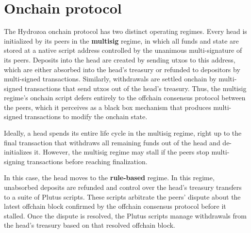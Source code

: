 \documentclass[../hydrozoa.tex]{subfiles}
\begin{document}
\chapter{Onchain protocol}%
\label{h:onchain-protocol}

The Hydrozoa onchain protocol has two distinct operating regimes.
Every head is initialized by its peers in the \textbf{multisig} regime, in which all funds and state are stored at a native script address controlled by the unanimous multi-signature of its peers.
Deposits into the head are created by sending utxos to this address, which are either absorbed into the head's treasury or refunded to depositors by multi-signed transactions.
Similarly, withdrawals are settled onchain by multi-signed transactions that send utxos out of the head's treasury.
Thus, the multisig regime's onchain script defers entirely to the offchain consensus protocol between the peers, which it perceives as a black box mechanism that produces multi-signed transactions to modify the onchain state.

Ideally, a head spends its entire life cycle in the multisig regime, right up to the final transaction that withdraws all remaining funds out of the head and de-initializes it.
However, the multisig regime may stall if the peers stop multi-signing transactions before reaching finalization.

In this case, the head moves to the \textbf{rule-based} regime.
In this regime, unabsorbed deposits are refunded and control over the head's treasury transfers to a suite of Plutus scripts. 
These scripts arbitrate the peers' dispute about the latest offchain block confirmed by the offchain consensus protocol before it stalled.
Once the dispute is resolved, the Plutus scripts manage withdrawals from the head's treasury based on that resolved offchain block.
\end{document}
